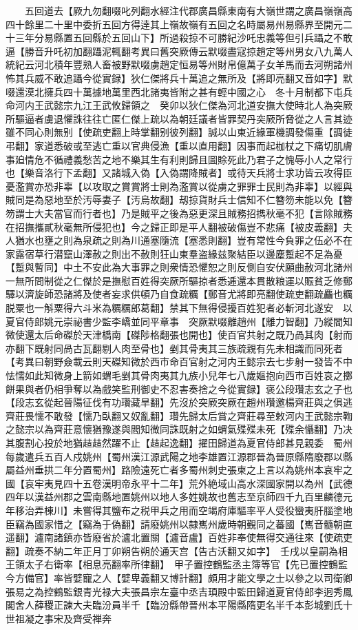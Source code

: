 　　五回道去【厥九勿翻啜叱列翻水經注代郡廣昌縣東南有大嶺世謂之廣昌嶺嶺高四十餘里二十里中委折五回方得逹其上嶺故嶺有五回之名時屬易州易縣界至開元二十三年分易縣置五回縣於五回山下】所過殺掠不可勝紀沙吒忠義等但引兵躡之不敢逼【勝音升吒初加翻躡泥輒翻考異曰舊突厥傳云默啜盡寇掠趙定等州男女八九萬人統紀云河北積年豐熟人畜被野默啜虜趙定恒易等州財帛億萬子女羊馬而去河朔諸州怖其兵威不敢追躡今從實録】狄仁傑將兵十萬追之無所及【將即亮翻又音如字】默啜還漠北擁兵四十萬據地萬里西北諸夷皆附之甚有輕中國之心　冬十月制都下屯兵命河内王武懿宗九江王武攸歸領之　癸卯以狄仁傑為河北道安撫大使時北人為突厥所驅逼者虜退懼誅往往亡匿仁傑上疏以為朝廷議者皆罪契丹突厥所脅從之人言其迹雖不同心則無别【使疏吏翻上時掌翻别彼列翻】誠以山東近緣軍機調發傷重【調徒弔翻】家道悉破或至逃亡重以官典侵漁【重以直用翻】因事而起枷杖之下痛切肌膚事廹情危不循禮義愁苦之地不樂其生有利則歸且圖賖死此乃君子之愧辱小人之常行也【樂音洛行下孟翻】又諸城入偽【入偽謂降賊者】或待天兵將士求功皆云攻得臣憂濫賞亦恐非辜【以攻取之賞賞將士則為濫賞以從虜之罪罪士民則為非辜】以經與賊同是為惡地至於汚辱妻子【汚烏故翻】刼掠貨財兵士信知不仁簪笏未能以免【簪笏謂士大夫當官而行者也】乃是賊平之後為惡更深且賊務招擕秋毫不犯【言除賊務在招撫攜貳秋毫無所侵犯也】今之歸正即是平人翻被破傷豈不悲痛【被皮義翻】夫人猶水也壅之則為泉疏之則為川通塞隨流【塞悉則翻】豈有常性今負罪之伍必不在家露宿草行潜竄山澤赦之則出不赦則狂山東羣盗緣兹聚結臣以邊塵蹔起不足為憂【蹔與暫同】中土不安此為大事罪之則衆情恐懼恕之則反側自安伏願曲赦河北諸州一無所問制從之仁傑於是撫慰百姓得突厥所驅掠者悉逓還本貫散粮運以賑貧乏修郵驛以濟旋師恐諸將及使者妄求供頓乃自食疏糲【郵音尤將即亮翻使疏吏翻疏麤也糲脱粟也一斛粟得六斗米為糲糲郎葛翻】禁其下無得侵擾百姓犯者必斬河北遂安　以夏官侍郎姚元崇祕書少監李嶠並同平章事　突厥默啜離趙州【離力智翻】乃縱閻知微使還太后命磔於天津橋南【磔陟格翻張也開也】使百官共射之既乃咼其肉【射而亦翻下既射同咼古瓦翻剔人肉至骨也】剉其骨夷其三族疏親有先未相識而同死者　【考異曰朝野僉載云則天磔知微於西市命百官射之河内王懿宗去七步射一發皆不中怯懦如此知微身上箭如蝟毛剉其骨肉夷其九族小兒年七八歲嫗抱向西市百姓哀之擲餅果與者仍相爭奪以為戲笑監刑御史不忍害奏捨之今從實録】褒公段瓚志玄之子也【段志玄從起晉陽征伐有功瓚藏旱翻】先沒於突厥突厥在趙州瓚邀楊齊莊與之俱逃齊莊畏懦不敢發【懦乃臥翻又奴亂翻】瓚先歸太后賞之齊莊尋至敕河内王武懿宗鞫之懿宗以為齊莊意懷猶豫遂與閻知微同誅既射之如蝟氣殜殜未死【殜余懾翻】乃决其腹割心投於地猶趌趌然躍不止【趌起逸翻】擢田歸道為夏官侍郎甚見親委　蜀州每歲遣兵五百人戍姚州【蜀州漢江源武陽之地李雄置江源郡晉為晉原縣隋廢郡以縣屬益州垂拱二年分置蜀州】路險遠死亡者多蜀州刺史張柬之上言以為姚州本哀牢之國【哀牢夷見四十五卷漢明帝永平十二年】荒外絶域山高水深國家開以為州【武德四年以漢益州郡之雲南縣地置姚州以地人多姓姚故也舊志至京師四千九百里麟德元年移治弄棟川】未嘗得其鹽布之税甲兵之用而空竭府庫驅率平人受役蠻夷肝腦塗地臣竊為國家惜之【竊為于偽翻】請廢姚州以隸嶲州歲時朝覲同之蕃國【嶲音髓朝直遥翻】瀘南諸鎮亦皆廢省於瀘北置關【瀘音盧】百姓非奉使無得交通往來【使疏吏翻】疏奏不納二年正月丁卯朔告朔於通天宫【告古沃翻又如字】　壬戌以皇嗣為相王領太子右衛率【相息亮翻率所律翻】　甲子置控鶴監丞主簿等官【先已置控鶴監今方備官】率皆嬖寵之人【嬖卑義翻又博計翻】頗用才能文學之士以參之以司衛卿張易之為控鶴監銀青光禄大夫張昌宗左臺中丞吉頊殿中監田歸道夏官侍郎李迥秀鳳閣舍人薛稷正諫大夫臨汾員半千【臨汾縣帶晉州本平陽縣隋更名半千本彭城劉氏十世祖凝之事宋及齊受禅奔